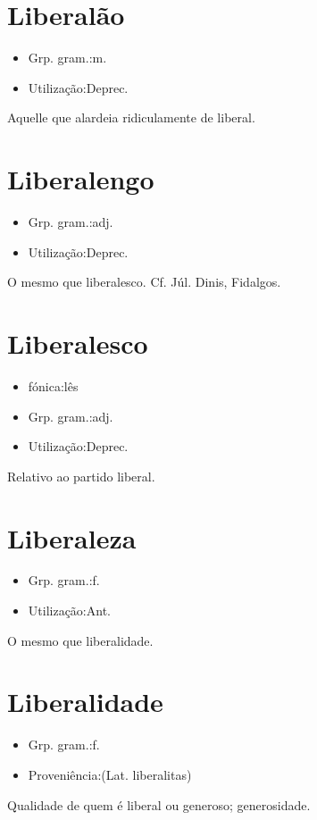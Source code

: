 \section{Liberalão}
\begin{itemize}
\item {Grp. gram.:m.}
\end{itemize}
\begin{itemize}
\item {Utilização:Deprec.}
\end{itemize}
Aquelle que alardeia ridiculamente de liberal.
\section{Liberalengo}
\begin{itemize}
\item {Grp. gram.:adj.}
\end{itemize}
\begin{itemize}
\item {Utilização:Deprec.}
\end{itemize}
O mesmo que \textunderscore liberalesco\textunderscore . Cf. Júl. Dinis, \textunderscore Fidalgos\textunderscore .
\section{Liberalesco}
\begin{itemize}
\item {fónica:lês}
\end{itemize}
\begin{itemize}
\item {Grp. gram.:adj.}
\end{itemize}
\begin{itemize}
\item {Utilização:Deprec.}
\end{itemize}
Relativo ao partido liberal.
\section{Liberaleza}
\begin{itemize}
\item {Grp. gram.:f.}
\end{itemize}
\begin{itemize}
\item {Utilização:Ant.}
\end{itemize}
O mesmo que \textunderscore liberalidade\textunderscore .
\section{Liberalidade}
\begin{itemize}
\item {Grp. gram.:f.}
\end{itemize}
\begin{itemize}
\item {Proveniência:(Lat. \textunderscore liberalitas\textunderscore )}
\end{itemize}
Qualidade de quem é liberal ou generoso; generosidade.
